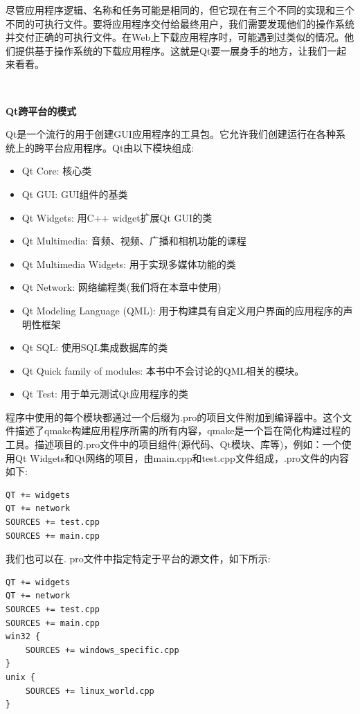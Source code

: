 尽管应用程序逻辑、名称和任务可能是相同的，但它现在有三个不同的实现和三个不同的可执行文件。要将应用程序交付给最终用户，我们需要发现他们的操作系统并交付正确的可执行文件。在Web上下载应用程序时，可能遇到过类似的情况。他们提供基于操作系统的下载应用程序。这就是Qt要一展身手的地方，让我们一起来看看。 \par

\noindent\textbf{}\ \par
\textbf{Qt跨平台的模式} \ \par
Qt是一个流行的用于创建GUI应用程序的工具包。它允许我们创建运行在各种系统上的跨平台应用程序。Qt由以下模块组成: \par

\begin{itemize}
	\item Qt Core: 核心类
	\item Qt GUI: GUI组件的基类
	\item Qt Widgets: 用C++ widget扩展Qt GUI的类
	\item Qt Multimedia: 音频、视频、广播和相机功能的课程
	\item Qt Multimedia Widgets: 用于实现多媒体功能的类
	\item Qt Network: 网络编程类(我们将在本章中使用)
	\item Qt Modeling Language (QML): 用于构建具有自定义用户界面的应用程序的声明性框架
	\item Qt SQL: 使用SQL集成数据库的类
	\item Qt Quick family of modules: 本书中不会讨论的QML相关的模块。
	\item Qt Test: 用于单元测试Qt应用程序的类
\end{itemize}

程序中使用的每个模块都通过一个后缀为.pro的项目文件附加到编译器中。这个文件描述了qmake构建应用程序所需的所有内容，qmake是一个旨在简化构建过程的工具。描述项目的.pro文件中的项目组件(源代码、Qt模块、库等)，例如：一个使用Qt Widgets和Qt网络的项目，由main.cpp和test.cpp文件组成，.pro文件的内容如下: \par

\begin{lstlisting}[caption={}]
QT += widgets
QT += network
SOURCES += test.cpp
SOURCES += main.cpp
\end{lstlisting}

我们也可以在. pro文件中指定特定于平台的源文件，如下所示: \par

\begin{lstlisting}[caption={}]
QT += widgets
QT += network
SOURCES += test.cpp
SOURCES += main.cpp
win32 {
	SOURCES += windows_specific.cpp
}
unix {
	SOURCES += linux_world.cpp
}
\end{lstlisting}

